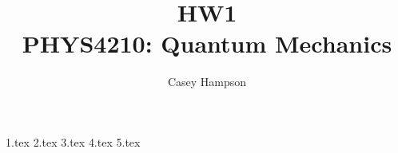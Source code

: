 \documentclass[titlepage]{article}
\title{HW1 \\[5pt] PHYS4210: Quantum Mechanics}
\author{Casey Hampson}
\begin{document}
    \maketitle
    \pagebreak

    {1.tex}
    {2.tex}
    {3.tex}
    {4.tex}
    {5.tex}
\end{document}
